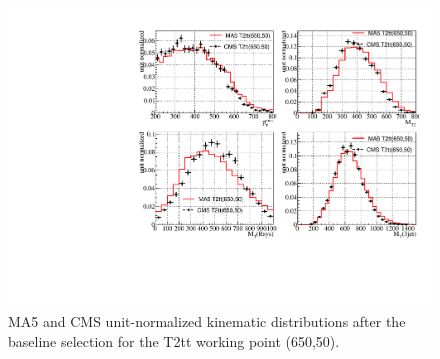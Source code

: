    \begin{figure}
  \caption{MA5 and CMS unit-normalized kinematic distributions after the baseline
    selection for the T2tt working point (650,50).}
  \centering
    \includegraphics[width=\textwidth]{figures/Appendices/Ma5ValidationSUS13012/T2tt-650-50.pdf}
\end{figure}

